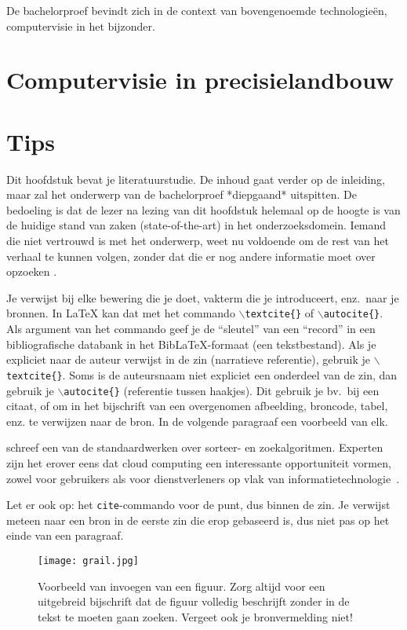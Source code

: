 De bachelorproef bevindt zich in de context van bovengenoemde technologieën, computervisie in het bijzonder.

\section{Computervisie in precisielandbouw}

\textcite{Radojcic2023}

\section{Tips}

Dit hoofdstuk bevat je literatuurstudie. De inhoud gaat verder op de inleiding, maar zal het onderwerp van de bachelorproef *diepgaand* uitspitten. De bedoeling is dat de lezer na lezing van dit hoofdstuk helemaal op de hoogte is van de huidige stand van zaken (state-of-the-art) in het onderzoeksdomein. Iemand die niet vertrouwd is met het onderwerp, weet nu voldoende om de rest van het verhaal te kunnen volgen, zonder dat die er nog andere informatie moet over opzoeken \autocite{Pollefliet2011}.

Je verwijst bij elke bewering die je doet, vakterm die je introduceert, enz.\ naar je bronnen. In \LaTeX{} kan dat met het commando \texttt{$\backslash${textcite\{\}}} of \texttt{$\backslash${autocite\{\}}}. Als argument van het commando geef je de ``sleutel'' van een ``record'' in een bibliografische databank in het Bib\LaTeX{}-formaat (een tekstbestand). Als je expliciet naar de auteur verwijst in de zin (narratieve referentie), gebruik je \texttt{$\backslash${}textcite\{\}}. Soms is de auteursnaam niet expliciet een onderdeel van de zin, dan gebruik je \texttt{$\backslash${}autocite\{\}} (referentie tussen haakjes). Dit gebruik je bv.~bij een citaat, of om in het bijschrift van een overgenomen afbeelding, broncode, tabel, enz. te verwijzen naar de bron. In de volgende paragraaf een voorbeeld van elk.

\textcite{Knuth1998} schreef een van de standaardwerken over sorteer- en zoekalgoritmen. Experten zijn het erover eens dat cloud computing een interessante opportuniteit vormen, zowel voor gebruikers als voor dienstverleners op vlak van informatietechnologie~\autocite{Creeger2009}.

Let er ook op: het \texttt{cite}-commando voor de punt, dus binnen de zin. Je verwijst meteen naar een bron in de eerste zin die erop gebaseerd is, dus niet pas op het einde van een paragraaf.

\begin{figure}
    \centering
    \texttt{[image: grail.jpg]}
    \caption[Voorbeeld figuur.]{\label{fig:grail}Voorbeeld van invoegen van een figuur. Zorg altijd voor een uitgebreid bijschrift dat de figuur volledig beschrijft zonder in de tekst te moeten gaan zoeken. Vergeet ook je bronvermelding niet!}
\end{figure}